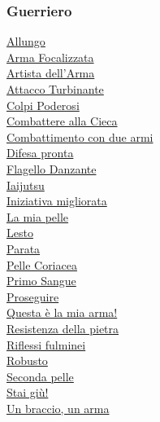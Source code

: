 \begin{multicols}{3}

{\small

\begin{flushleft}

\titlespacing*{\subsubsection}{0pt}{0.5em}{0.5em}\subsubsection*{Guerriero}

\hyperlink{Allungo}{Allungo}\\
\hyperlink{Arma Focalizzata}{Arma Focalizzata}\\
\hyperlink{Artista dell'Arma}{Artista dell'Arma}\\
\hyperlink{Attacco Turbinante}{Attacco Turbinante}\\
\hyperlink{Colpi Poderosi}{Colpi Poderosi}\\
\hyperlink{Combattere alla Cieca}{Combattere alla Cieca}\\
\hyperlink{Combattimento con due armi}{Combattimento con due armi}\\
\hyperlink{Difesa pronta}{Difesa pronta}\\
\hyperlink{Flagello Danzante}{Flagello Danzante}\\
\hyperlink{Iaijutsu}{Iaijutsu}\\
\hyperlink{Iniziativa migliorata}{Iniziativa migliorata}\\
\hyperlink{La mia pelle}{La mia pelle}\\
\hyperlink{Lesto}{Lesto}\\
\hyperlink{Parata}{Parata}\\
\hyperlink{Pelle Coriacea}{Pelle Coriacea}\\
\hyperlink{Primo Sangue}{Primo Sangue}\\
\hyperlink{Proseguire}{Proseguire}\\
\hyperlink{Questa è la mia arma!}{Questa è la mia arma!}\\
\hyperlink{Resistenza della pietra}{Resistenza della pietra}\\
\hyperlink{Riflessi fulminei}{Riflessi fulminei}\\
\hyperlink{Robusto}{Robusto}\\
\hyperlink{Seconda pelle}{Seconda pelle}\\
\hyperlink{Stai giù!}{Stai giù!}\\
\hyperlink{Un braccio, un arma}{Un braccio, un arma}


\end{flushleft}}
\end{multicols}
